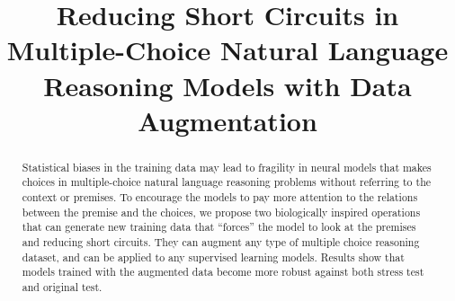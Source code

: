 \documentclass[runningheads]{llncs}
\begin{document}
%
\title{Reducing Short Circuits in Multiple-Choice Natural Language Reasoning Models with Data Augmentation}
%
%
\iffalse
\author{First Author\inst{1}\orcidID{0000-1111-2222-3333} \and
Second Author\inst{2,3}\orcidID{1111-2222-3333-4444} \and
Third Author\inst{3}\orcidID{2222--3333-4444-5555}}
%
\authorrunning{F. Author et al.}
%
\institute{Princeton University, Princeton NJ 08544, USA \and
Springer Heidelberg, Tiergartenstr. 17, 69121 Heidelberg, Germany
\email{lncs@springer.com}\\
\url{http://www.springer.com/gp/computer-science/lncs} \and
ABC Institute, Rupert-Karls-University Heidelberg, Heidelberg, Germany\\
\email{\{abc,lncs\}@uni-heidelberg.de}}
\fi
%
\maketitle              %
%
\begin{abstract}
Statistical biases in the training data may lead to fragility in 
neural models that makes choices in multiple-choice natural language 
reasoning problems without referring to the context or premises. 
To encourage the models to pay more attention to the relations between 
the premise and the choices, we propose two biologically inspired operations 
that can generate new training data that ``forces'' the model
to look at the premises and reducing short circuits. They can augment
any type of multiple choice reasoning dataset, and can be applied to
any supervised learning models. Results show that models trained
with the augmented data become more robust against both stress test  
and original test.


\end{abstract}
%
%









\end{document}
